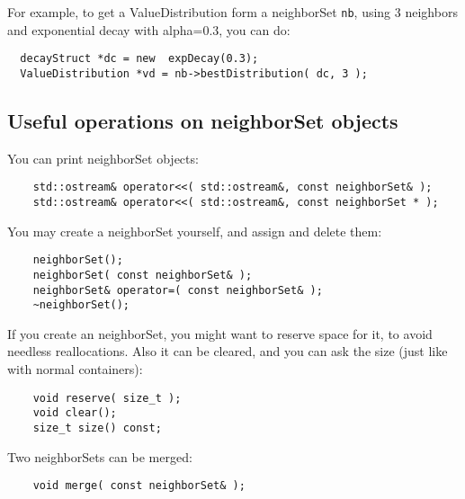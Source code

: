 \documentclass{report}
\begin{document}
For example, to get a ValueDistribution form a neighborSet {\tt nb}, using
3 neighbors and exponential decay with alpha=0.3, you can do:

\begin{footnotesize}
\begin{verbatim}
  decayStruct *dc = new  expDecay(0.3);
  ValueDistribution *vd = nb->bestDistribution( dc, 3 );
\end{verbatim}
\end{footnotesize}


\subsection{Useful operations on neighborSet objects}

You can print neighborSet objects:

\begin{footnotesize}
\begin{verbatim}
    std::ostream& operator<<( std::ostream&, const neighborSet& );
    std::ostream& operator<<( std::ostream&, const neighborSet * );
\end{verbatim}
\end{footnotesize}

You may create a neighborSet yourself, and assign and delete them:

\begin{footnotesize}
\begin{verbatim}
    neighborSet();
    neighborSet( const neighborSet& );
    neighborSet& operator=( const neighborSet& );
    ~neighborSet();
\end{verbatim}
\end{footnotesize}

If you create an neighborSet, you might want to reserve space for it,
to avoid needless reallocations. Also it can be cleared, and you can
ask the size (just like with normal containers):

\begin{footnotesize}
\begin{verbatim}
    void reserve( size_t );
    void clear();
    size_t size() const;
\end{verbatim}
\end{footnotesize}

Two neighborSets can be merged:

\begin{footnotesize}
\begin{verbatim}
    void merge( const neighborSet& );
\end{verbatim}
\end{footnotesize}
\end{document}
